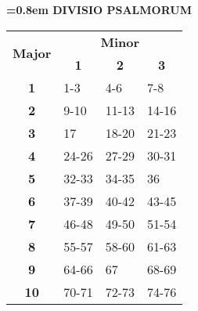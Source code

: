 \documentclass[twoside,10pt]{book}
\begin{document}
\newpage
\pagestyle{myheadings}
\setcounter{page}{1}

{
  \vspace*{5em}
  {
    \begin{center}
    {\bfseries{}\font=0.8em DIVISIO PSALMORUM}
    \end{center}
  }

  {
    \begin{table}[ht]
    \centering
    \begin{tabular}{|cccc|}
    \hline
    \multicolumn{1}{|c|}{\multirow{2}{*}{\textbf{Major}}} & \multicolumn{3}{c|}{\textbf{Minor}}   \\ \cline{2-4}
    \multicolumn{1}{|c|}{}   & \multicolumn{1}{c|}{\textbf{1}} & \multicolumn{1}{c|}{\textbf{2}} & \multicolumn{1}{c|}{\textbf{3}} \\ \hline
    \multicolumn{1}{|c|}{\textbf{1}}  & \multicolumn{1}{l|}{1-3} & \multicolumn{1}{l|}{4-6} & \multicolumn{1}{l|}{7-8} \\ \hline
    \multicolumn{1}{|c|}{\textbf{2}}  & \multicolumn{1}{l|}{9-10} & \multicolumn{1}{l|}{11-13} & \multicolumn{1}{l|}{14-16} \\ \hline
    \multicolumn{1}{|c|}{\textbf{3}}  & \multicolumn{1}{l|}{17} & \multicolumn{1}{l|}{18-20} & \multicolumn{1}{l|}{21-23} \\ \hline
    \multicolumn{1}{|c|}{\textbf{4}}  & \multicolumn{1}{l|}{24-26} & \multicolumn{1}{l|}{27-29} & \multicolumn{1}{l|}{30-31} \\ \hline
    \multicolumn{1}{|c|}{\textbf{5}}  & \multicolumn{1}{l|}{32-33} & \multicolumn{1}{l|}{34-35} & \multicolumn{1}{l|}{36} \\ \hline
    \multicolumn{1}{|c|}{\textbf{6}}  & \multicolumn{1}{l|}{37-39} & \multicolumn{1}{l|}{40-42} & \multicolumn{1}{l|}{43-45} \\ \hline
    \multicolumn{1}{|c|}{\textbf{7}}  & \multicolumn{1}{l|}{46-48} & \multicolumn{1}{l|}{49-50} & \multicolumn{1}{l|}{51-54} \\ \hline
    \multicolumn{1}{|c|}{\textbf{8}}  & \multicolumn{1}{l|}{55-57} & \multicolumn{1}{l|}{58-60} & \multicolumn{1}{l|}{61-63} \\ \hline
    \multicolumn{1}{|c|}{\textbf{9}}  & \multicolumn{1}{l|}{64-66} & \multicolumn{1}{l|}{67} & \multicolumn{1}{l|}{68-69} \\ \hline
    \multicolumn{1}{|c|}{\textbf{10}} & \multicolumn{1}{l|}{70-71} & \multicolumn{1}{l|}{72-73} & \multicolumn{1}{l|}{74-76} \\ \hline

\end{tabular}
\end{table}}}
\end{document}
